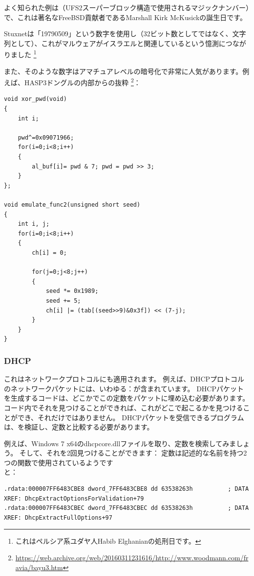 よく知られた例は（UFS2スーパーブロック構造で使用されるマジックナンバー）で、これは著名なFreeBSD貢献者であるMarshall Kirk McKusickの誕生日です。

Stuxnetは「19790509」という数字を使用し（32ビット数としてではなく、文字列として）、これがマルウェアがイスラエルと関連しているという憶測につながりました
\footnote{これはペルシア系ユダヤ人Habib Elghanianの処刑日です。}

また、そのような数字はアマチュアレベルの暗号化で非常に人気があります。例えば、HASP3ドングルの内部からの抜粋
\footnote{\url{https://web.archive.org/web/20160311231616/http://www.woodmann.com/fravia/bayu3.htm}}：

\begin{lstlisting}[style=customc]
void xor_pwd(void) 
{ 
	int i; 
	
	pwd^=0x09071966;
	for(i=0;i<8;i++) 
	{ 
		al_buf[i]= pwd & 7; pwd = pwd >> 3; 
	} 
};

void emulate_func2(unsigned short seed)
{ 
	int i, j; 
	for(i=0;i<8;i++) 
	{ 
		ch[i] = 0; 
		
		for(j=0;j<8;j++)
		{ 
			seed *= 0x1989; 
			seed += 5; 
			ch[i] |= (tab[(seed>>9)&0x3f]) << (7-j); 
		}
	} 
}
\end{lstlisting}

\subsubsection{DHCP}

これはネットワークプロトコルにも適用されます。
例えば、DHCPプロトコルのネットワークパケットには、いわゆる：が含まれています。
DHCPパケットを生成するコードは、どこかでこの定数をパケットに埋め込む必要があります。
コード内でそれを見つけることができれば、これがどこで起こるかを見つけることができ、それだけではありません。
DHCPパケットを受信できるプログラムは、を検証し、定数と比較する必要があります。

例えば、Windows 7 x64のdhcpcore.dllファイルを取り、定数を検索してみましょう。
そして、それを2回見つけることができます：
定数は記述的な名前を持つ2つの関数で使用されているようです\\
と：

\begin{lstlisting}[caption=dhcpcore.dll (Windows 7 x64),style=customasmx86]
.rdata:000007FF6483CBE8 dword_7FF6483CBE8 dd 63538263h          ; DATA XREF: DhcpExtractOptionsForValidation+79
.rdata:000007FF6483CBEC dword_7FF6483CBEC dd 63538263h          ; DATA XREF: DhcpExtractFullOptions+97
\end{lstlisting}

